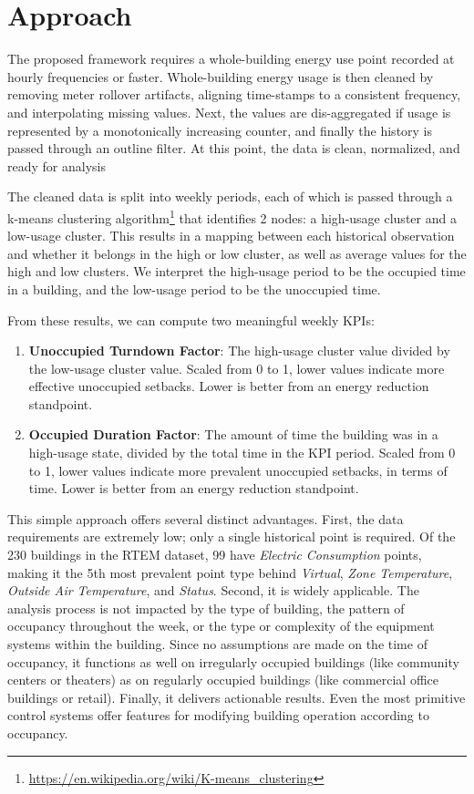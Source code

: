 \documentclass[a4paper]{article}
\begin{document}
\section{Approach}

The proposed framework requires a whole-building energy use point recorded at hourly frequencies or faster. Whole-building energy usage is then cleaned by removing meter rollover artifacts, aligning time-stamps to a consistent frequency, and interpolating missing values. Next, the values are dis-aggregated if usage is represented by a monotonically increasing counter, and finally the history is passed through an outline filter. At this point, the data is clean, normalized, and ready for analysis

The cleaned data is split into weekly periods, each of which is passed through a k-means clustering algorithm\footnote{\url{https://en.wikipedia.org/wiki/K-means\_clustering}} that identifies 2 nodes: a high-usage cluster and a low-usage cluster. This results in a mapping between each historical observation and whether it belongs in the high or low cluster, as well as average values for the high and low clusters. We interpret the high-usage period to be the occupied time in a building, and the low-usage period to be the unoccupied time.

From these results, we can compute two meaningful weekly KPIs:
\begin{enumerate}
\item{\textbf{Unoccupied Turndown Factor}: The high-usage cluster value divided by the low-usage cluster value. Scaled from 0 to 1, lower values indicate more effective unoccupied setbacks. Lower is better from an energy reduction standpoint.}
\item{\textbf{Occupied Duration Factor}: The amount of time the building was in a high-usage state, divided by the total time in the KPI period. Scaled from 0 to 1, lower values indicate more prevalent unoccupied setbacks, in terms of time.  Lower is better from an energy reduction standpoint.}
\end{enumerate}

This simple approach offers several distinct advantages. First, the data requirements are extremely low; only a single historical point is required. Of the 230 buildings in the RTEM dataset, 99 have \textit{Electric Consumption} points, making it the 5th most prevalent point type behind \textit{Virtual}, \textit{Zone Temperature}, \textit{Outside Air Temperature}, and \textit{Status}. Second, it is widely applicable. The analysis process is not impacted by the type of building, the pattern of occupancy throughout the week, or the type or complexity of the equipment systems within the building. Since no assumptions are made on the time of occupancy, it functions as well on irregularly occupied buildings (like community centers or theaters) as on regularly occupied buildings (like commercial office buildings or retail). Finally, it delivers actionable results. Even the most primitive control systems offer features for modifying building operation according to occupancy.
\end{document}
